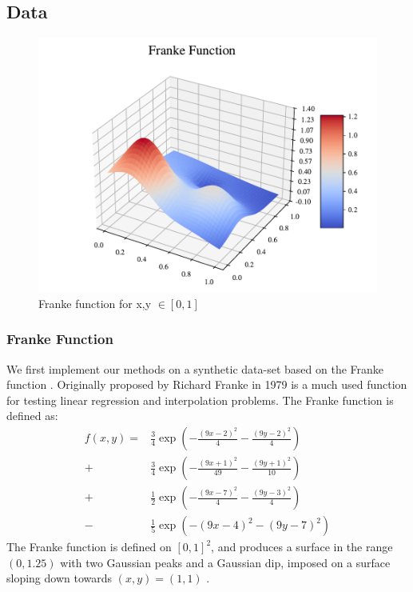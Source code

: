 \subsection{Data}

\begin{figure}[h!]
\centering
\includegraphics[width=1\linewidth]{project_1/figures/figures_in_report/franke_func.pdf}
\caption{Franke function for x,y $\in [0,1]$}
\label{franke}
\end{figure}

\subsubsection{Franke Function}
We first implement our methods on a synthetic data-set based on the Franke function \citep[p. 13]{frank}. Originally proposed by Richard Franke in 1979 is a much used function for testing linear regression and interpolation problems.
The Franke function is defined as:
\begin{align}\label{eq:franke}
    f(x, y) = &\frac{3}{4} \exp\left( -\frac{(9x - 2)^2}{4} - \frac{(9y - 2)^2}{4} \right) \nonumber \\
    + &\frac{3}{4} \exp\left( -\frac{(9x + 1)^2}{49} - \frac{(9y + 1)^2}{10} \right) \nonumber \\
    + &\frac{1}{2} \exp\left( -\frac{(9x - 7)^2}{4} - \frac{(9y - 3)^2}{4} \right) \nonumber \\
    - &\frac{1}{5} \exp\left( -(9x - 4)^2 - (9y - 7)^2 \right)
\end{align}
The Franke function is defined on $[0, 1]^2$, and produces a surface in the range $(0, 1.25)$ with two Gaussian peaks and a Gaussian dip, imposed on a surface sloping down towards $(x,y)=(1, 1)$ \citep[p. 13]{frank}.

